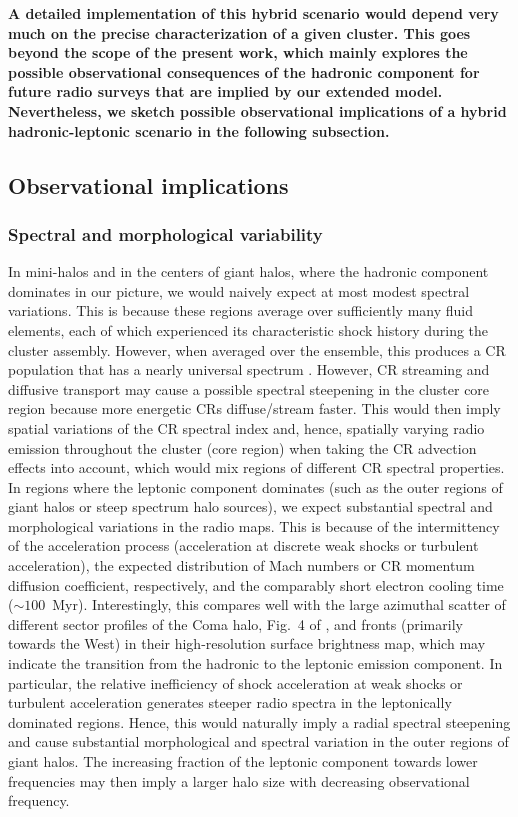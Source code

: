 \documentclass[useAMS,usenatbib]{mn2e}
\begin{document}
{\bf A detailed implementation of this hybrid scenario would depend very much on
  the precise characterization of a given cluster. This goes beyond the scope of
  the present work, which mainly explores the possible observational
  consequences of the hadronic component for future radio surveys that are
  implied by our extended model. Nevertheless, we sketch possible observational
  implications of a hybrid hadronic-leptonic scenario in the following
  subsection.}

\subsection{Observational implications}

\subsubsection{Spectral and morphological variability}
In mini-halos and in the centers of giant halos, where the hadronic component
dominates in our picture, we would naively expect at most modest spectral
variations. This is because these regions average over sufficiently many fluid
elements, each of which experienced its characteristic shock history during the
cluster assembly. However, when averaged over the ensemble, this produces a CR
population that has a nearly universal spectrum
\citep{2010MNRAS.409..449P}. However, CR streaming and diffusive transport may
cause a possible spectral steepening in the cluster core region because more
energetic CRs diffuse/stream faster. This would then imply spatial variations of
the CR spectral index and, hence, spatially varying radio emission throughout
the cluster (core region) when taking the CR advection effects into account,
which would mix regions of different CR spectral properties. In regions where
the leptonic component dominates (such as the outer regions of giant halos or
steep spectrum halo sources), we expect substantial spectral and morphological
variations in the radio maps. This is because of the intermittency of the
acceleration process (acceleration at discrete weak shocks or turbulent
acceleration), the expected distribution of Mach numbers or CR momentum
diffusion coefficient, respectively, and the comparably short electron cooling
time ($\sim100$~Myr). Interestingly, this compares well with the large azimuthal
scatter of different sector profiles of the Coma halo, Fig.~4 of
\cite{2011MNRAS.412....2B}, and fronts (primarily towards the West) in their
high-resolution surface brightness map, which may indicate the transition from
the hadronic to the leptonic emission component. In particular, the relative
inefficiency of shock acceleration at weak shocks or turbulent acceleration
generates steeper radio spectra in the leptonically dominated regions. Hence,
this would naturally imply a radial spectral steepening and cause substantial
morphological and spectral variation in the outer regions of giant halos. The
increasing fraction of the leptonic component towards lower frequencies may then
imply a larger halo size with decreasing observational frequency.
\end{document}
